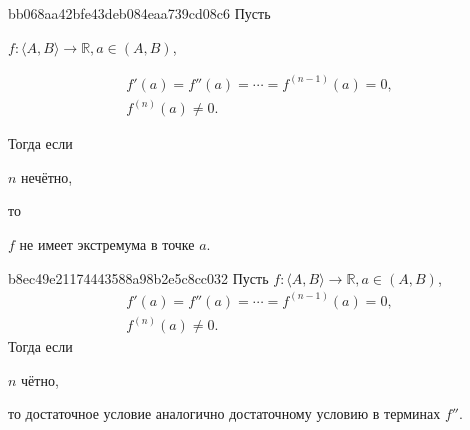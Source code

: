 \begin{note}{bb068aa42bfe43deb084eaa739cd08c6}
    Пусть \begin{icloze}{4}\( f : \langle A, B \rangle \to \mathbb R, a \in (A, B) \),\end{icloze}
    \begin{icloze}{3}\[
                         \begin{gathered}
                             f'(a) = f''(a) = \cdots = f^{(n - 1)}(a) = 0, \\
                             f^{(n)}(a) \neq 0.
                         \end{gathered}
                     \]\end{icloze}
    Тогда если \begin{icloze}{2}\( n \) нечётно,\end{icloze} то \begin{icloze}{1}\( f \) не имеет экстремума в точке \( a \).\end{icloze}
\end{note}

\begin{note}{b8ec49e21174443588a98b2e5c8cc032}
    Пусть \( f : \langle A, B \rangle \to \mathbb R, a \in (A, B) \),
    \[
        \begin{gathered}
            f'(a) = f''(a) = \cdots = f^{(n - 1)}(a) = 0, \\
            f^{(n)}(a) \neq 0.
        \end{gathered}
    \]
    Тогда если \begin{icloze}{2}\( n \) чётно,\end{icloze} \begin{icloze}{1}то достаточное условие аналогично достаточному условию в терминах \( f'' \).\end{icloze}
\end{note}


